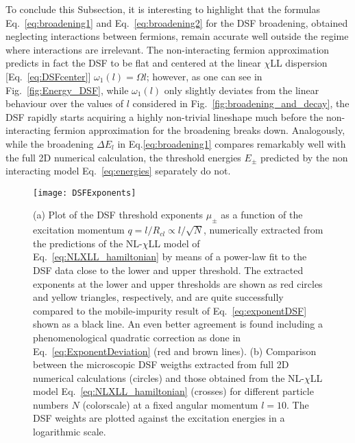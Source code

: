 \documentclass[twocolumn,pra,superscriptaddress,noshowpacs]{revtex4}
\newcommand{\substitution}[2]{\textcolor{red}{(\st{#1})$\rightarrow$}\textcolor{blue}{#2}}
\newcommand{\nlchill}{NL-$\chi$LL }
\begin{document}
To conclude this Subsection, it is interesting to highlight that the formulas Eq.~\eqref{eq:broadening1} and Eq.~\eqref{eq:broadening2} for the DSF broadening, obtained neglecting interactions between fermions, remain %
accurate well outside the regime where interactions are irrelevant. 
The non-interacting fermion approximation predicts in fact the DSF to be flat and centered at the linear $\chi$LL dispersion [Eq.~\eqref{eq:DSFcenter}] $\omega_1(l)=\Omega l$; however, as one can see in Fig.~\ref{fig:Energy_DSF}, while $\omega_1(l)$ only slightly deviates from the linear behaviour over the values of $l$ considered in Fig.~\ref{fig:broadening_and_decay}, the DSF rapidly starts
acquiring a highly non-trivial lineshape much before the non-interacting fermion approximation for the broadening breaks down.
Analogously, while the broadening $\Delta E_l$ in Eq.\eqref{eq:broadening1} compares remarkably well with the full 2D numerical calculation, the threshold energies $E_\pm$ predicted by the non interacting model Eq.~\eqref{eq:energies} separately do not.

\begin{figure}[htbp]
   	\begin{adjustbox}{width=.5\textwidth, totalheight=\baselineskip,keepaspectratio,right}
      	\texttt{[image: DSFExponents]}
    \end{adjustbox}
    \vspace{0.0cm}\caption{(a) Plot of the DSF threshold exponents $\mu_\pm$ as a function of the excitation momentum $q=l/R_{cl}\propto l/\sqrt{N}$, numerically extracted from the predictions of the \nlchill model of Eq.~\eqref{eq:NLXLL_hamiltonian} by means of a power-law fit to the DSF data close to the lower and upper threshold. The
    extracted exponents at the lower and upper thresholds are shown as red circles and yellow triangles, respectively, and are quite successfully compared to the mobile-impurity result of Eq.~\eqref{eq:exponentDSF} shown as a black line. An even better agreement is found including a phenomenological quadratic correction as done in Eq.~\eqref{eq:ExponentDeviation} (red and brown lines).
    (b) Comparison between the microscopic DSF weigths extracted from full 2D numerical calculations (circles)
    and those obtained from the \nlchill model Eq.~\eqref{eq:NLXLL_hamiltonian} (crosses) for different particle numbers $N$ (colorscale) at a fixed angular momentum $l=10$. The DSF weights are plotted against the excitation energies in a logarithmic scale.
    \label{fig:DSFexponents}}
\end{figure}
\end{document}
